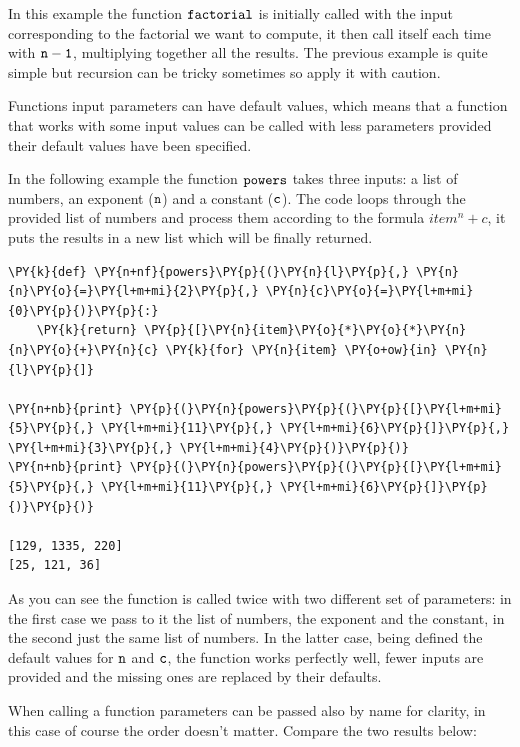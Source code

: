 In this example the function $\tt{factorial}$ is initially called with the input corresponding to the factorial we want to compute, it then call itself each time with $\tt{n-1}$, multiplying together all the results.
The previous example is quite simple but recursion can be tricky sometimes so apply it with caution. 

Functions input parameters can have default values, which means that a function that works with some input values can be called with less parameters provided their default values have been specified.

In the following example the function $\tt{powers}$ takes three inputs: a list of numbers, an exponent ($\tt{n}$) and a constant ($\tt{c}$). The code loops through the provided list of numbers and process them according to the formula $item^{n} + c$, it puts the results in a new list which will be finally returned.

\begin{tcolorbox}[breakable, size=fbox, boxrule=1pt, pad at break*=1mm,colback=cellbackground, colframe=cellborder]
\begin{Verbatim}[commandchars=\\\{\}]
\PY{k}{def} \PY{n+nf}{powers}\PY{p}{(}\PY{n}{l}\PY{p}{,} \PY{n}{n}\PY{o}{=}\PY{l+m+mi}{2}\PY{p}{,} \PY{n}{c}\PY{o}{=}\PY{l+m+mi}{0}\PY{p}{)}\PY{p}{:}
    \PY{k}{return} \PY{p}{[}\PY{n}{item}\PY{o}{*}\PY{o}{*}\PY{n}{n}\PY{o}{+}\PY{n}{c} \PY{k}{for} \PY{n}{item} \PY{o+ow}{in} \PY{n}{l}\PY{p}{]}

\PY{n+nb}{print} \PY{p}{(}\PY{n}{powers}\PY{p}{(}\PY{p}{[}\PY{l+m+mi}{5}\PY{p}{,} \PY{l+m+mi}{11}\PY{p}{,} \PY{l+m+mi}{6}\PY{p}{]}\PY{p}{,} \PY{l+m+mi}{3}\PY{p}{,} \PY{l+m+mi}{4}\PY{p}{)}\PY{p}{)}
\PY{n+nb}{print} \PY{p}{(}\PY{n}{powers}\PY{p}{(}\PY{p}{[}\PY{l+m+mi}{5}\PY{p}{,} \PY{l+m+mi}{11}\PY{p}{,} \PY{l+m+mi}{6}\PY{p}{]}\PY{p}{)}\PY{p}{)}

[129, 1335, 220]
[25, 121, 36]
\end{Verbatim}
\end{tcolorbox}
    
As you can see the function is called twice with two different set of parameters: in the first case we pass to it the list of numbers, the exponent and the constant, in the second just the same list of numbers.
In the latter case, being defined the default values for $\tt{n}$ and $\tt{c}$, the function works perfectly well, fewer inputs are provided and the missing ones are replaced by their defaults. 

When calling a function parameters can be passed also by name for clarity, in this case of course the order doesn't matter. Compare the two results below:

